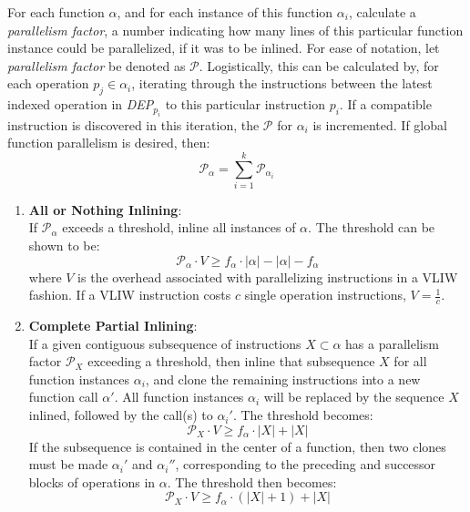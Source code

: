 \documentclass[12pt,twoside]{article}
\begin{document}
For each function $\alpha$, and for each instance of this function $\alpha_i$, calculate a \emph{parallelism factor}, a number indicating how many lines of this particular function instance could be parallelized, if it was to be inlined. For ease of notation, let \emph{parallelism factor} be denoted as $\mathcal{P}$. Logistically, this can be calculated by, for each operation $p_j \in \alpha_i$, iterating through the instructions between the latest indexed operation in \emph{DEP}$_{p_i}$ to this particular instruction $p_i$. If a compatible instruction is discovered in this iteration, the $\mathcal{P}$ for $\alpha_i$ is incremented. If global function parallelism is desired, then: 	\begin{equation}
	\mathcal{P}_{\alpha} = \sum_{i=1}^k \mathcal{P}_{\alpha_i} 
	\end{equation}
\begin{enumerate}
	\item \textbf{All or Nothing Inlining}:\\
		If $\mathcal{P}_{\alpha}$ exceeds a threshold, inline all instances of $\alpha$. The threshold can be shown to be:
		\begin{equation}
			\mathcal{P}_{\alpha} \cdot V \geq f_{\alpha} \cdot |\alpha| - |\alpha| - f_{\alpha}
		\end{equation}
		where $V$ is the overhead associated with parallelizing instructions in a VLIW fashion. If a VLIW instruction costs $c$ single operation instructions, $V = \frac{1}{c}$.
	\item \textbf{Complete Partial Inlining}:\\
		If a given contiguous subsequence of instructions $X \subset \alpha$ has a parallelism factor $\mathcal{P}_{X}$ exceeding a threshold, then inline that subsequence $X$ for all function instances $\alpha_i$, and clone the remaining instructions into a new function call $\alpha'$. All function instances $\alpha_i$ will be replaced by the sequence $X$ inlined, followed by the call(s) to $\alpha_i'$.
		The threshold becomes:
		\begin{equation}
			\mathcal{P}_X \cdot V \geq f_{\alpha} \cdot |X| + |X|
		\end{equation}
		If the subsequence is contained in the center of a function, then two clones must be made $\alpha_i'$ and $\alpha_i''$, corresponding to the preceding and successor blocks of operations in $\alpha$. The threshold then becomes:
		\begin{equation}
			\mathcal{P}_X \cdot V \geq f_{\alpha} \cdot (|X|+1) + |X|
		\end{equation}


\end{enumerate}
\end{document}
